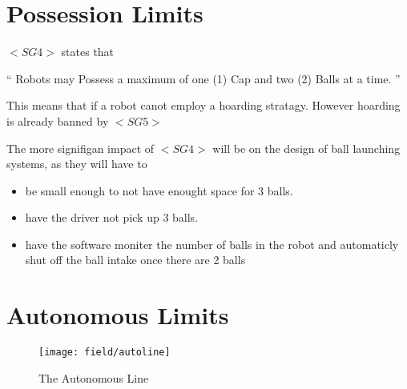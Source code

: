 \documentclass[../main.tex]{subfiles}
\begin{document}
\section{Possession Limits}

$<SG4>$ states that

`` Robots may Possess a maximum of one (1) Cap 
and two (2) Balls at a time. ''
\par

This means that if a robot canot employ a hoarding stratagy.
However hoarding is already banned by $<SG5>$ \par

The more signifigan impact of $<SG4>$ will be on the design of
ball launching systems, as they will have to

\begin{itemize}
    \item be small enough to not have enought space for 3 balls.
    \item have the driver not pick up 3 balls.
    \item have the software moniter the number of balls in the robot
          and automaticly shut off the ball intake once there are 2 balls
\end{itemize}

\section{Autonomous Limits}
\begin{figure}
    \centering    
    \texttt{[image: field/autoline]}
    \caption{The Autonomous Line}
    \label{fig:autoline}
\end{figure}
\end{document}
